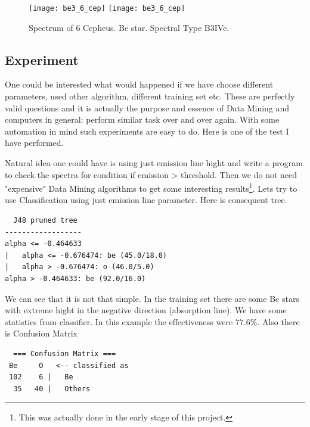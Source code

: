    \begin{figure}[!htbp]
      \begin{center}
        \leavevmode
        \ifpdf
        \texttt{[image: be3\_6\_cep]}
        \else
        \texttt{[image: be3\_6\_cep]}
        \fi
        \caption{Spectrum of 6 Cepheus. Be star. Spectral Type B3IVe.}
        \label{FigBe3}
      \end{center}
    \end{figure}



\clearpage

\subsection{Experiment}

One could be interested what would happened if we have choose
different parameters, used other algorithm, different training set
etc. These are perfectly valid questions and it is actually the purpose
and essence of Data Mining and computers in general: perform similar
task over and over again. With some automation in mind such
experiments are easy to do. Here is one of the test I have performed.

Natural idea one could have is using just emission line hight and
write a program to check the spectra for condition \textrm{if emission
  > threshold}. Then we do not need "expensive" Data Mining algorithms to
get some interesting results\footnote{This was actually done in the early
stage of this project.}. Lets try to use Classification using just
emission line parameter. Here is consequent tree.


\begin{lstlisting}
  J48 pruned tree
------------------
alpha <= -0.464633
|   alpha <= -0.676474: be (45.0/18.0)
|   alpha > -0.676474: o (46.0/5.0)
alpha > -0.464633: be (92.0/16.0)
\end{lstlisting}

We can see that it is not that simple. In the training set there are
some Be stars with extreme hight in the negative direction (absorption
line). We have some statistics from classifier. In this example
the effectiveness were $77.6$\%. Also there is Confusion Matrix 

\begin{lstlisting}
  === Confusion Matrix ===
 Be     O   <-- classified as
 102    6 |   Be
  35   40 |   Others
\end{lstlisting}

